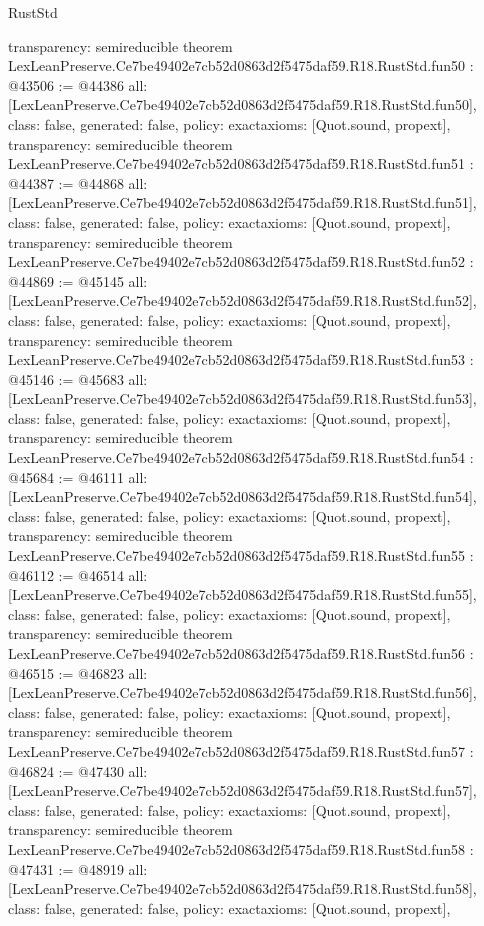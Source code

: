 \begin{lexlean}{RustStd}
\begin{coremodule}
{  transparency: semireducible
}
theorem LexLeanPreserve.Ce7be49402e7cb52d0863d2f5475daf59.R18.RustStd.fun50 : @43506 := @44386 {
  all: [LexLeanPreserve.Ce7be49402e7cb52d0863d2f5475daf59.R18.RustStd.fun50],
  class: false,
  generated: false,
  policy: exact{axioms: [Quot.sound, propext]},
  transparency: semireducible
}
theorem LexLeanPreserve.Ce7be49402e7cb52d0863d2f5475daf59.R18.RustStd.fun51 : @44387 := @44868 {
  all: [LexLeanPreserve.Ce7be49402e7cb52d0863d2f5475daf59.R18.RustStd.fun51],
  class: false,
  generated: false,
  policy: exact{axioms: [Quot.sound, propext]},
  transparency: semireducible
}
theorem LexLeanPreserve.Ce7be49402e7cb52d0863d2f5475daf59.R18.RustStd.fun52 : @44869 := @45145 {
  all: [LexLeanPreserve.Ce7be49402e7cb52d0863d2f5475daf59.R18.RustStd.fun52],
  class: false,
  generated: false,
  policy: exact{axioms: [Quot.sound, propext]},
  transparency: semireducible
}
theorem LexLeanPreserve.Ce7be49402e7cb52d0863d2f5475daf59.R18.RustStd.fun53 : @45146 := @45683 {
  all: [LexLeanPreserve.Ce7be49402e7cb52d0863d2f5475daf59.R18.RustStd.fun53],
  class: false,
  generated: false,
  policy: exact{axioms: [Quot.sound, propext]},
  transparency: semireducible
}
theorem LexLeanPreserve.Ce7be49402e7cb52d0863d2f5475daf59.R18.RustStd.fun54 : @45684 := @46111 {
  all: [LexLeanPreserve.Ce7be49402e7cb52d0863d2f5475daf59.R18.RustStd.fun54],
  class: false,
  generated: false,
  policy: exact{axioms: [Quot.sound, propext]},
  transparency: semireducible
}
theorem LexLeanPreserve.Ce7be49402e7cb52d0863d2f5475daf59.R18.RustStd.fun55 : @46112 := @46514 {
  all: [LexLeanPreserve.Ce7be49402e7cb52d0863d2f5475daf59.R18.RustStd.fun55],
  class: false,
  generated: false,
  policy: exact{axioms: [Quot.sound, propext]},
  transparency: semireducible
}
theorem LexLeanPreserve.Ce7be49402e7cb52d0863d2f5475daf59.R18.RustStd.fun56 : @46515 := @46823 {
  all: [LexLeanPreserve.Ce7be49402e7cb52d0863d2f5475daf59.R18.RustStd.fun56],
  class: false,
  generated: false,
  policy: exact{axioms: [Quot.sound, propext]},
  transparency: semireducible
}
theorem LexLeanPreserve.Ce7be49402e7cb52d0863d2f5475daf59.R18.RustStd.fun57 : @46824 := @47430 {
  all: [LexLeanPreserve.Ce7be49402e7cb52d0863d2f5475daf59.R18.RustStd.fun57],
  class: false,
  generated: false,
  policy: exact{axioms: [Quot.sound, propext]},
  transparency: semireducible
}
theorem LexLeanPreserve.Ce7be49402e7cb52d0863d2f5475daf59.R18.RustStd.fun58 : @47431 := @48919 {
  all: [LexLeanPreserve.Ce7be49402e7cb52d0863d2f5475daf59.R18.RustStd.fun58],
  class: false,
  generated: false,
  policy: exact{axioms: [Quot.sound, propext]},
}
\end{coremodule}
\end{lexlean}
